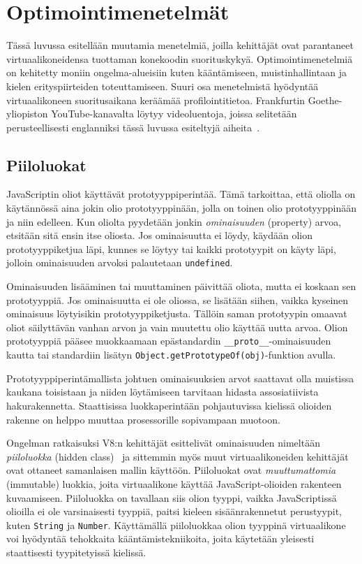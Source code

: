 \pagebreak
\section{Optimointimenetelmät}

Tässä luvussa esitellään muutamia menetelmiä, joilla kehittäjät ovat parantaneet virtuaalikoneidensa tuottaman konekoodin suorituskykyä. Optimointimenetelmiä on kehitetty moniin ongelma-alueisiin kuten kääntämiseen, muistinhallintaan ja kielen erityspiirteiden toteuttamiseen. Suuri osa menetelmistä hyödyntää virtuaalikoneen suoritusaikana keräämää profilointitietoa. Frankfurtin Goethe-yliopiston YouTube-kanavalta löytyy videoluentoja, joissa selitetään perusteellisesti englanniksi tässä luvussa esiteltyjä aiheita~\cite{goetheuni}.

\subsection{Piiloluokat}

JavaScriptin oliot käyttävät prototyyppiperintää. Tämä tarkoittaa, että oliolla on käytännössä aina jokin olio prototyyppinään, jolla on toinen olio prototyyppinään ja niin edelleen. Kun oliolta pyydetään jonkin \textit{ominaisuuden} (property) arvoa, etsitään sitä ensin itse oliosta. Jos ominaisuutta ei löydy, käydään olion prototyyppiketjua läpi, kunnes se löytyy tai kaikki prototyypit on käyty läpi, jolloin ominaisuuden arvoksi palautetaan \texttt{undefined}.

Ominaisuuden lisääminen tai muuttaminen päivittää oliota, mutta ei koskaan sen prototyyppiä. Jos ominaisuutta ei ole oliossa, se lisätään siihen, vaikka kyseinen ominaisuus löytyisikin prototyyppiketjusta. Tällöin saman prototyypin omaavat oliot säilyttävän vanhan arvon ja vain muutettu olio käyttää uutta arvoa. Olion prototyyppiä pääsee muokkaamaan epästandardin \texttt{\_\_proto\_\_}-ominaisuuden kautta tai standardiin lisätyn \texttt{Object.get\-PrototypeOf(obj)}-funktion avulla.

Prototyyppiperintämallista johtuen ominaisuuksien arvot saattavat olla muistissa kaukana toisistaan ja niiden löytämiseen tarvitaan hidasta assosiatiivista hakurakennetta. Staattisissa luokkaperintään pohjautuvissa kielissä olioiden rakenne on helppo muuttaa prosessorille sopivampaan muotoon.

\pagebreak
Ongelman ratkaisuksi V8:n kehittäjät esittelivät ominaisuuden nimeltään \textit{piiloluokka} (hidden class)~\cite{v8design} ja sittemmin myös muut virtuaalikoneiden kehittäjät ovat ottaneet samanlaisen mallin käyttöön. Piiloluokat ovat \textit{muuttumattomia} (immutable) luokkia, joita virtuaalikone käyttää JavaScript-olioiden rakenteen kuvaamiseen. Piiloluokka on tavallaan siis olion tyyppi, vaikka JavaScriptissä olioilla ei ole varsinaisesti tyyppiä, paitsi kieleen sisäänrakennetut perustyypit, kuten \texttt{String} ja \texttt{Number}. Käyttämällä piiloluokkaa olion tyyppinä virtuaalikone voi hyödyntää tehokkaita kääntämistekniikoita, joita käytetään yleisesti staattisesti tyypitetyissä kielissä.

